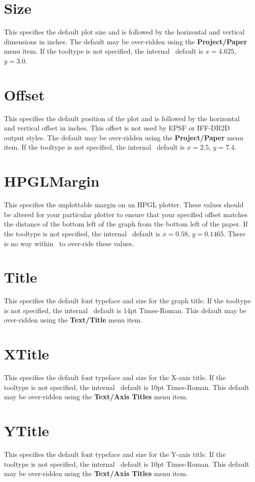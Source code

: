 \section{Size}
This specifies the default plot size and is followed by the horizontal and vertical 
dimensions in inches. The default may be over-ridden using the {\bf Project/Paper} 
menu item. If the tooltype is not specified, the internal \amplot\ default 
is $x=4.625$, $y=3.0$.

\section{Offset}
This specifies the default position of the plot and is followed by the horizontal 
and vertical offset in inches. This offset is not used by EPSF or IFF-DR2D output 
styles. The default may be over-ridden using the {\bf Project/Paper} menu item.
If the tooltype is not specified, the internal \amplot\ default is 
$x=2.5$, $y=7.4$.

\section{HPGLMargin}
This specifies the unplottable margin on an HPGL plotter. These values should be 
altered for your particular plotter to ensure that your specified offset matches the 
distance of the bottom left of the graph from the bottom left of the paper. If the 
tooltype is not specified, the internal \amplot\ default is $x=0.58$, $y=0.1465$.
There is no way within \amplot\ to over-ride these values.

\section{Title}
This specifies the default font typeface and size for the graph title.  If the 
tooltype is not specified, the internal \amplot\ default is 14pt Times-Roman.
This default may be over-ridden using the {\bf Text/Title} menu item.

\section{XTitle}
This specifies the default font typeface and size for the X-axis title.  If the 
tooltype is not specified, the internal \amplot\ default is 10pt Times-Roman.
This default may be over-ridden using the {\bf Text/Axis Titles} menu item.

\section{YTitle}
This specifies the default font typeface and size for the Y-axis title.  If the 
tooltype is not specified, the internal \amplot\ default is 10pt Times-Roman.
This default may be over-ridden using the {\bf Text/Axis Titles} menu item.

